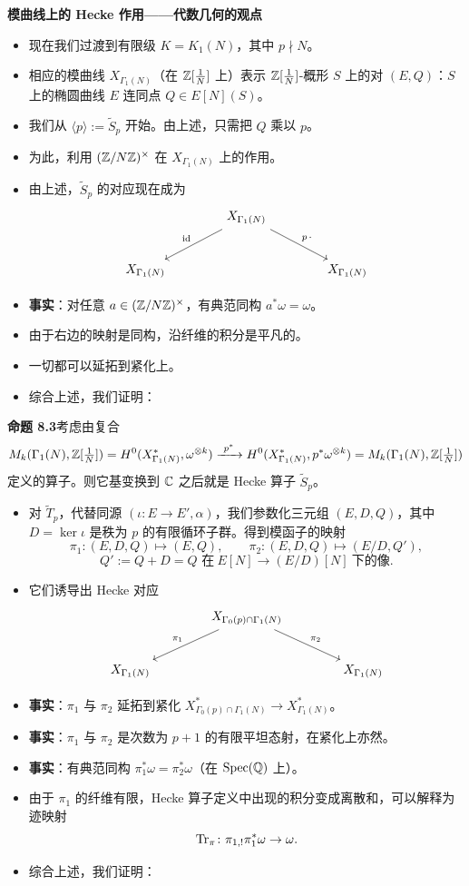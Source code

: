 \medskip
\noindent\textbf{模曲线上的 Hecke 作用——代数几何的观点}
\begin{itemize}
\item 现在我们过渡到有限级 $K=K_1(N)$，其中 $p\nmid N$。
\item 相应的模曲线 $X_{\Gamma_1(N)}$（在 $\mathbb{Z}[\frac1N]$ 上）表示 $\mathbb{Z}[\frac1N]$-概形 $S$ 上的对 $(E,Q)$：$S$ 上的椭圆曲线 $E$ 连同点 $Q\in E[N](S)$。
\item 我们从 $\langle p\rangle:=\tilde S_p$ 开始。由上述，只需把 $Q$ 乘以 $p$。
\item 为此，利用 $(\mathbb{Z}/N\mathbb{Z})^\times$ 在 $X_{\Gamma_1(N)}$ 上的作用。
\item 由上述，$\tilde S_p$ 的对应现在成为
\[
\begin{tikzcd}[column sep=4em, row sep=2.4em]
& X_{\Gamma_1(N)}\arrow[dl,"\mathrm{id}"']\arrow[dr,"p\,\cdot"] &\\
X_{\Gamma_1(N)} & & X_{\Gamma_1(N)}
\end{tikzcd}
\]
\item \textbf{事实}：对任意 $a\in(\mathbb{Z}/N\mathbb{Z})^\times$，有典范同构 $a^*\omega=\omega$。
\item 由于右边的映射是同构，沿纤维的积分是平凡的。
\item 一切都可以延拓到紧化上。
\item 综合上述，我们证明：
\end{itemize}

\noindent\textbf{命题 8.3}\label{prop:8.3}\quad 考虑由复合
\[
M_k(\Gamma_1(N),\mathbb{Z}[\tfrac1N])=H^0(X^*_{\Gamma_1(N)},\omega^{\otimes k})\xrightarrow{\ p^*\ }H^0(X^*_{\Gamma_1(N)},p^*\omega^{\otimes k})=M_k(\Gamma_1(N),\mathbb{Z}[\tfrac1N])
\]
定义的算子。则它基变换到 $\mathbb{C}$ 之后就是 Hecke 算子 $\tilde S_p$。

\begin{itemize}
\item 对 $\tilde T_p$，代替同源 $(\iota\colon E\to E',\alpha)$，我们参数化三元组 $(E,D,Q)$，其中 $D=\ker\iota$ 是秩为 $p$ 的有限循环子群。得到模函子的映射
\[
\pi_1\colon(E,D,Q)\mapsto(E,Q),\qquad \pi_2\colon(E,D,Q)\mapsto(E/D,Q'),
\]
\[
Q':=Q+D=\text{$Q$ 在}\ E[N]\to(E/D)[N]\ \text{下的像}.
\]
\item 它们诱导出 Hecke 对应
\[
\begin{tikzcd}[column sep=4em, row sep=2.4em]
& X_{\Gamma_0(p)\cap\Gamma_1(N)}\arrow[dl,"\pi_1"']\arrow[dr,"\pi_2"] &\\
X_{\Gamma_1(N)} & & X_{\Gamma_1(N)}
\end{tikzcd}
\]
\item \textbf{事实}：$\pi_1$ 与 $\pi_2$ 延拓到紧化 $X^*_{\Gamma_0(p)\cap\Gamma_1(N)}\to X^*_{\Gamma_1(N)}$。
\item \textbf{事实}：$\pi_1$ 与 $\pi_2$ 是次数为 $p+1$ 的有限平坦态射，在紧化上亦然。
\item \textbf{事实}：有典范同构 $\pi_1^*\omega=\pi_2^*\omega$（在 $\operatorname{Spec}(\mathbb{Q})$ 上）。
\item 由于 $\pi_1$ 的纤维有限，Hecke 算子定义中出现的积分变成离散和，可以解释为迹映射
\[
\operatorname{Tr}_\pi\colon\pi_{1,!}\pi_1^*\omega\to\omega .
\]
\item 综合上述，我们证明：
\end{itemize}

